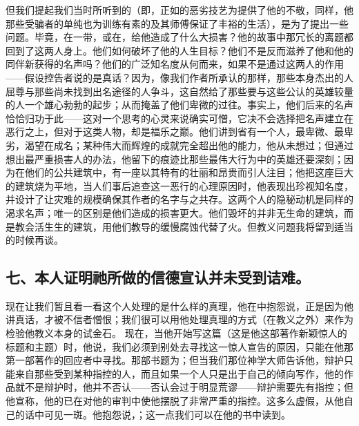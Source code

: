 但我们提起我们当时所听到的（即，正如的恶劣技艺为提供了他的不敬，同样，他那些受骗者的单纯也为训练有素的及其师傅保证了丰裕的生活），是为了提出一些问题。毕竟，在一带，或在，给他造成了什么大损害？他的故事中那冗长的离题都回到了这两人身上。他们如何破坏了他的人生目标？他们不是反而滋养了他和他的同伴新获得的名声吗？他们的广泛知名度从何而来，如果不是通过这两人的作用——假设控告者说的是真话？因为，像我们作者所承认的那样，那些本身杰出的人屈尊与那些尚未找到出名途径的人争斗，这自然给了那些要与这些公认的英雄较量的人一个雄心勃勃的起步；从而掩盖了他们卑微的过往。事实上，他们后来的名声恰恰归功于此——这对一个思考的心灵来说确实可憎，它决不会选择把名声建立在恶行之上，但对于这类人物，却是福乐之巅。他们讲到省有一个人，最卑微、最卑劣，渴望在成名；某种伟大而辉煌的成就完全超出他的能力，他从未想过；但通过想出最严重损害人的办法，他留下的痕迹比那些最伟大行为中的英雄还要深刻；因为在他们的公共建筑中，有一座以其特有的壮丽和昂贵而引人注目；他把这座巨大的建筑烧为平地，当人们事后追查这一恶行的心理原因时，他表现出珍视知名度，并设计了让灾难的规模确保其作者的名字与之共存。这两个人的隐秘动机是同样的渴求名声；唯一的区别是他们造成的损害更大。他们毁坏的并非无生命的建筑，而是教会活生生的建筑，用他们教导的缓慢腐蚀代替了火。但教义问题我将留到适当的时候再谈。\par


\subsection{七、本人证明祂所做的信德宣认并未受到诘难。}

现在让我们暂且看一看这个人处理的是什么样的真理，他在中抱怨说，正是因为他讲真话，才被不信者憎恨；我们很可以用他处理真理的方式（在教义之外）来作为检验他教义本身的试金石。\newline{} 现在，当他开始写这篇（这是他这部著作新颖惊人的标题和主题）时，他说，我们必须到别处去寻找这一惊人宣告的原因，只能在他那第一部著作的回应者中寻找。那部书题为；但当我们那位神学大师告诉他，辩护只能来自那些受到某种指控的人，而且如果一个人只是出于自己的倾向写作，他的作品就不是辩护时，他并不否认——否认会过于明显荒谬——辩护需要先有指控；但他宣称，他的已在对他的审判中使他摆脱了非常严重的指控。这多么虚假，从他自己的话中可见一斑。他抱怨说，；这一点我们可以在他的书中读到。\par

